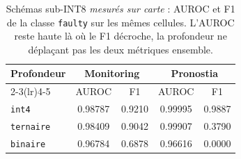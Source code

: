 \begin{table}[htbp]
\centering
\caption{Schémas sub-INT8 \emph{mesurés sur carte} : AUROC et F1 de la classe \texttt{faulty} sur les mêmes cellules. L'AUROC reste haute là où le F1 décroche, la profondeur ne déplaçant pas les deux métriques ensemble.}
\label{tab:depth-board}
\begin{tabular}{lcccc}
\toprule
Profondeur & \multicolumn{2}{c}{Monitoring} & \multicolumn{2}{c}{Pronostia} \\
\cmidrule(lr){2-3}\cmidrule(lr){4-5}
 & AUROC & F1 & AUROC & F1 \\
\midrule
\texttt{int4} & \num{0.98787} & \num{0.9210} & \num{0.99995} & \num{0.9887} \\
\texttt{ternaire} & \num{0.98409} & \num{0.9042} & \num{0.99907} & \num{0.3790} \\
\texttt{binaire} & \num{0.96784} & \num{0.6878} & \num{0.96616} & \num{0.0000} \\
\bottomrule
\end{tabular}
\end{table}
